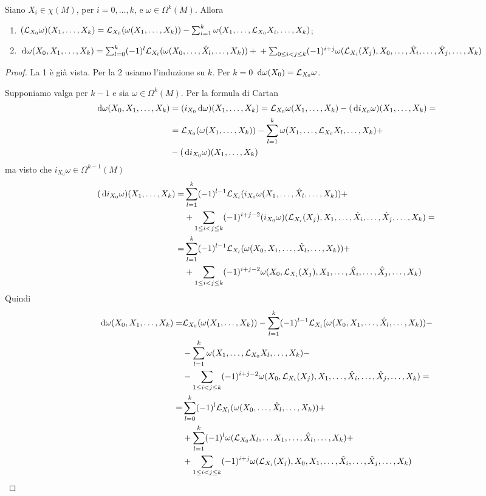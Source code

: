 \begin{proposition}
	Siano $X_i\in\chi(M)$, per $i=0,\ldots,k$, e $\omega \in \Omega^k(M)$. Allora
	\begin{enumerate}
		\item $(\Lie_{X_0} \omega) (\seqb Xk,) = \Lie_{X_0}(\omega(\seqb Xk,)) - \sum_{i=1}^k \omega(X_1,\ldots, \Lie_{X_0}X_i, \ldots, X_k)$;
		\item $\de \omega (X_0,X_1,\ldots,X_k) = \sum_{l=0}^k (-1)^l\Lie_{X_l}(\omega(X_0,\ldots, \hat X_l, \ldots, X_k)) + \\
		+\sum_{0\le i<j\le k}(-1)^{i+j} \omega (\Lie_{X_i}(X_j),X_0,\ldots,\hat X_i,\ldots, \hat X_j,\ldots, X_k)$
	\end{enumerate}
\end{proposition}
\begin{proof}
	La 1 è già vista. Per la 2 usiamo l'induzione su $k$.
	Per $k=0$ $\de \omega (X_0) = \Lie_{X_0} \omega$.
	
	Supponiamo valga per $k-1$ e sia $\omega \in \Omega^k(M)$. Per la formula di Cartan
	\begin{align*}
		\de \omega (X_0,\seqb Xk,) &= (i_{X_0}\de \omega)(\seqb Xk,) = \Lie_{X_0}\omega(\seqb Xk,) - (\de i_{X_0} \omega) (\seqb Xk,) =\\
		&= \Lie_{X_0}(\omega(\seqb Xk,)) - \sum_{l=1}^k \omega (X_1,\ldots,\Lie_{X_0}X_l,\ldots, X_k)+ \\
		&-(\de i_{X_0}\omega) (\seqb Xk,)
	\end{align*}
	ma visto che $i_{X_0}\omega \in \Omega^{k-1}(M)$
	\begin{align*}
		(\de i_{X_0}\omega) (\seqb Xk,) =& \sum_{l=1}^{k} (-1)^{l-1} \Lie_{X_l}(i_{X_0}\omega (X_1,\ldots, \hat X_l, \ldots, X_k)) +\\
		&+\sum_{1\le i< j \le k} (-1)^{i+j-2} (i_{X_0}\omega)(\Lie_{X_i}(X_j),X_1,\ldots, \hat X_i, \ldots, \hat X_j,\ldots, X_k) = \\
		=& \sum_{l=1}^{k} (-1)^{l-1} \Lie_{X_l}(\omega (X_0,X_1,\ldots, \hat X_l, \ldots, X_k)) +\\
		&+\sum_{1\le i< j \le k} (-1)^{i+j-2} \omega(X_0,\Lie_{X_i}(X_j),X_1,\ldots, \hat X_i, \ldots, \hat X_j,\ldots, X_k)
	\end{align*}
	Quindi
	\begin{align*}
		\de \omega (X_0,\seqb Xk,) =& \Lie_{X_0}(\omega(\seqb Xk,)) - \sum_{l=1}^{k} (-1)^{l-1} \Lie_{X_l}(\omega(X_0,X_1, \ldots, \hat X_l,\ldots, X_k)) -\\
		&-\sum_{l=1}^k\omega(X_1,\ldots, \Lie_{X_0}X_l,\ldots,X_k)-\\
		&-\sum_{1\le i<j \le k} (-1)^{i+j-2} \omega (X_0,\Lie_{X_i}(X_j),X_1,\ldots,\hat X_i,\ldots,\hat X_j,\ldots,X_k)=\\
		=&\sum_{l=0}^{k} (-1)^l \Lie_{X_l}(\omega(X_0, \ldots, \hat X_l,\ldots, X_k)) +\\
		&+\sum_{l=1}^k(-1)^l\omega(\Lie_{X_0}X_l,\ldots X_1,\ldots,\hat X_l,\ldots ,X_k)+\\
		&+\sum_{1\le i<j \le k} (-1)^{i+j} \omega (\Lie_{X_i}(X_j),X_0,X_1,\ldots,\hat X_i,\ldots,\hat X_j,\ldots,X_k)
	\end{align*}

	
\end{proof}

